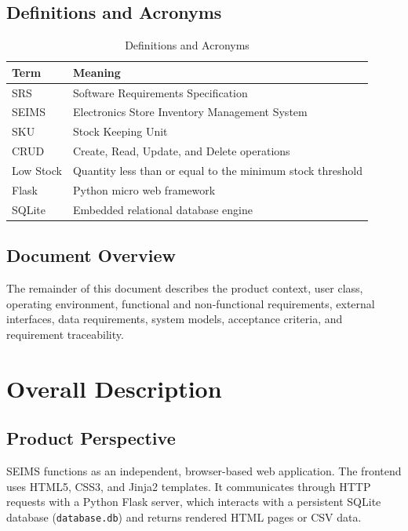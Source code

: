 \documentclass[conference]{IEEEtran}
\begin{document}
\subsection{Definitions and Acronyms}

\begin{table}[!t]
\caption{Definitions and Acronyms}
\label{tab:acronyms}
\centering
\small
\begin{tabularx}{\columnwidth}{lY}
\toprule
\textbf{Term} & \textbf{Meaning}\\
\midrule
SRS & Software Requirements Specification\\
SEIMS & Electronics Store Inventory Management System\\
SKU & Stock Keeping Unit\\
CRUD & Create, Read, Update, and Delete operations\\
Low Stock & Quantity less than or equal to the minimum stock threshold\\
Flask & Python micro web framework\\
SQLite & Embedded relational database engine\\
\bottomrule
\end{tabularx}
\end{table}

\subsection{Document Overview}

The remainder of this document describes the product context, user class, operating environment, functional and non-functional requirements, external interfaces, data requirements, system models, acceptance criteria, and requirement traceability.

\section{Overall Description}

\subsection{Product Perspective}

SEIMS functions as an independent, browser-based web application. The frontend uses HTML5, CSS3, and Jinja2 templates. It communicates through HTTP requests with a Python Flask server, which interacts with a persistent SQLite database (\texttt{database.db}) and returns rendered HTML pages or CSV data.
\end{document}
